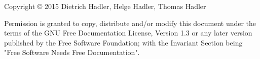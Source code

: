 



 \vspace{15cm}


 
\noindent
Copyright \copyright \hspace{0.5mm}  2015 Dietrich Hadler, Helge Hadler, Thomas Hadler

 \vspace{1cm}

\noindent
Permission is granted to copy, distribute and/or modify this document under the terms of the GNU Free Documentation License, Version 1.3 or any later version published by the Free Software Foundation; with the Invariant Section being "Free Software Needs Free Documentation". 
\normalsize